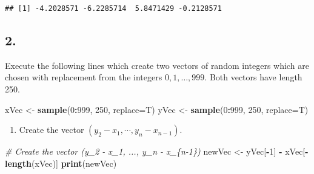 \documentclass[
]{article}
\newenvironment{Shaded}{\begin{snugshade}}{\end{snugshade}}
\newcommand{\AttributeTok}[1]{\textcolor[rgb]{0.13,0.29,0.53}{#1}}
\newcommand{\CommentTok}[1]{\textcolor[rgb]{0.56,0.35,0.01}{\textit{#1}}}
\newcommand{\DecValTok}[1]{\textcolor[rgb]{0.00,0.00,0.81}{#1}}
\newcommand{\FunctionTok}[1]{\textcolor[rgb]{0.13,0.29,0.53}{\textbf{#1}}}
\newcommand{\NormalTok}[1]{#1}
\newcommand{\OtherTok}[1]{\textcolor[rgb]{0.56,0.35,0.01}{#1}}
\newcommand{\SpecialCharTok}[1]{\textcolor[rgb]{0.81,0.36,0.00}{\textbf{#1}}}
\providecommand{\tightlist}{%
  \setlength{\itemsep}{0pt}\setlength{\parskip}{0pt}}
\begin{document}
\begin{verbatim}
## [1] -4.2028571 -6.2285714  5.8471429 -0.2128571
\end{verbatim}

\subsection{2.}\label{section-1}

Execute the following lines which create two vectors of random integers
which are chosen with replacement from the integers
\(0, 1, \dots , 999\). Both vectors have length 250.

\begin{Shaded}
\begin{Highlighting}[]
\NormalTok{xVec }\OtherTok{\textless{}{-}} \FunctionTok{sample}\NormalTok{(}\DecValTok{0}\SpecialCharTok{:}\DecValTok{999}\NormalTok{, }\DecValTok{250}\NormalTok{, }\AttributeTok{replace=}\NormalTok{T)}
\NormalTok{yVec }\OtherTok{\textless{}{-}} \FunctionTok{sample}\NormalTok{(}\DecValTok{0}\SpecialCharTok{:}\DecValTok{999}\NormalTok{, }\DecValTok{250}\NormalTok{, }\AttributeTok{replace=}\NormalTok{T)}
\end{Highlighting}
\end{Shaded}

\begin{enumerate}
\def\labelenumi{(\alph{enumi})}
\tightlist
\item
  Create the vector \((y_2 - x_1, \cdots, y_n - x_{n-1}).\)
\end{enumerate}

\begin{Shaded}
\begin{Highlighting}[]
\CommentTok{\# Create the vector (y\_2 {-} x\_1, ..., y\_n {-} x\_\{n{-}1\})}
\NormalTok{newVec }\OtherTok{\textless{}{-}}\NormalTok{ yVec[}\SpecialCharTok{{-}}\DecValTok{1}\NormalTok{] }\SpecialCharTok{{-}}\NormalTok{ xVec[}\SpecialCharTok{{-}}\FunctionTok{length}\NormalTok{(xVec)]}
\FunctionTok{print}\NormalTok{(newVec)}
\end{Highlighting}
\end{Shaded}
\end{document}
